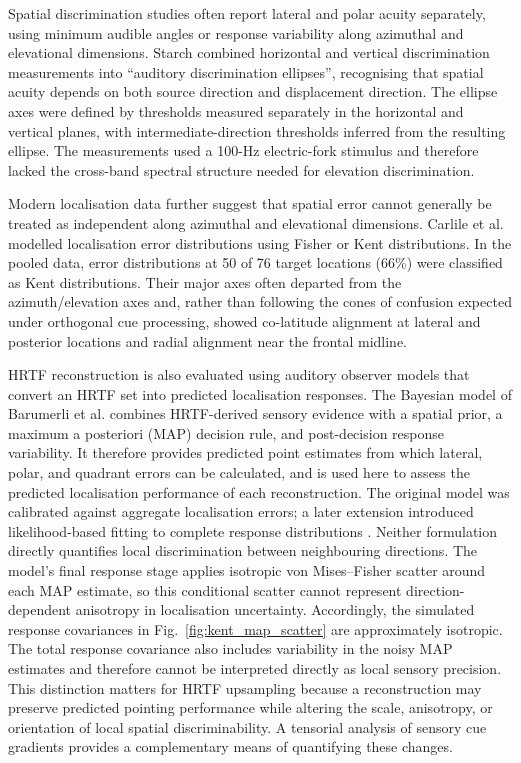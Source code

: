 \documentclass[journal]{IEEEtran}
\begin{document}
Spatial discrimination studies often report lateral and polar acuity separately, using minimum audible angles or response variability along azimuthal and elevational dimensions. Starch \cite{Starch1905} combined horizontal and vertical discrimination measurements into ``auditory discrimination ellipses'', recognising that spatial acuity depends on both source direction and displacement direction. The ellipse axes were defined by thresholds measured separately in the horizontal and vertical planes, with intermediate-direction thresholds inferred from the resulting ellipse. The measurements used a 100-Hz electric-fork stimulus and therefore lacked the cross-band spectral structure needed for elevation discrimination.

Modern localisation data further suggest that spatial error cannot generally be treated as independent along azimuthal and elevational dimensions. Carlile et al. \cite{Carlile1997} modelled localisation error distributions using Fisher or Kent distributions. In the pooled data, error distributions at 50 of 76 target locations (66\%) were classified as Kent distributions. Their major axes often departed from the azimuth/elevation axes and, rather than following the cones of confusion expected under orthogonal cue processing, showed co-latitude alignment at lateral and posterior locations and radial alignment near the frontal midline.

HRTF reconstruction is also evaluated using auditory observer models that convert an HRTF set into predicted localisation responses. The Bayesian model of Barumerli et al. \cite{Barumerli2023} combines HRTF-derived sensory evidence with a spatial prior, a maximum a posteriori (MAP) decision rule, and post-decision response variability. It therefore provides predicted point estimates from which lateral, polar, and quadrant errors can be calculated, and is used here to assess the predicted localisation performance of each reconstruction. The original model was calibrated against aggregate localisation errors; a later extension introduced likelihood-based fitting to complete response distributions \cite{Barumerli2026}. Neither formulation directly quantifies local discrimination between neighbouring directions. The model's final response stage applies isotropic von Mises--Fisher scatter around each MAP estimate, so this conditional scatter cannot represent direction-dependent anisotropy in localisation uncertainty. Accordingly, the simulated response covariances in Fig.~\ref{fig:kent_map_scatter} are approximately isotropic. The total response covariance also includes variability in the noisy MAP estimates and therefore cannot be interpreted directly as local sensory precision. This distinction matters for HRTF upsampling because a reconstruction may preserve predicted pointing performance while altering the scale, anisotropy, or orientation of local spatial discriminability. A tensorial analysis of sensory cue gradients provides a complementary means of quantifying these changes.
\end{document}
